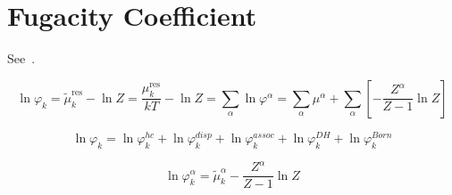 \documentclass[12pt, letterpaper]{article}
\begin{document}
\section{Fugacity Coefficient}

See~\cite{Gross2001}.

\begin{equation}
    \ln\varphi_{k}
    =
    \tilde{\mu}_{k}^{\mathrm{res}}-\ln Z
    =
    \frac{\mu_{k}^{\mathrm{res}}}{kT}-\ln Z
    =
    \sum_\alpha \ln \varphi^\alpha
    =
    \sum_\alpha \mu^\alpha+\sum_\alpha\left[-\frac{Z^\alpha}{Z-1} \ln Z\right]
    \label{eq:lnphi_total}
\end{equation}


\begin{equation}
    \ln\varphi_{k}
    =
    \ln\varphi_{k}^{hc}
    +
    \ln\varphi_{k}^{disp}
    +
    \ln\varphi_{k}^{assoc}
    +
    \ln\varphi_{k}^{DH}
    +
    \ln\varphi_{k}^{Born}
    \label{eq:lnphi_total_sum}
\end{equation}


\begin{equation}
    \ln\varphi_{k}^{\alpha}
    =
    \tilde{\mu}_{k}^{\alpha}
    -
    \frac{Z^{\alpha}}{Z-1}\ln Z
    \label{eq:lnphi_alpha}
\end{equation}

\end{document}
